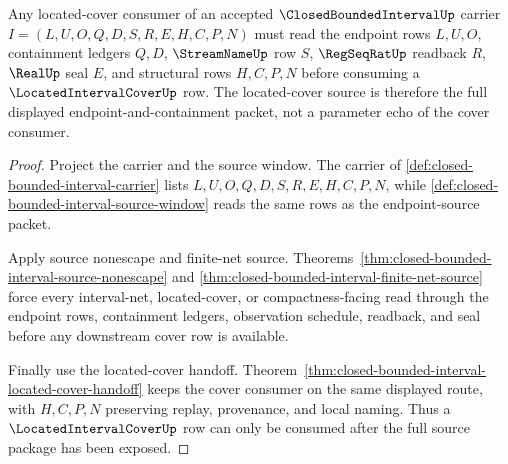 \begin{theorem}
\label{thm:closed-bounded-interval-located-cover-source-totality}
Any located-cover consumer of an accepted $\ClosedBoundedIntervalUp$ carrier $I=(L,U,O,Q,D,S,R,E,H,C,P,N)$ must read the endpoint rows $L,U,O$, containment ledgers $Q,D$, $\StreamNameUp$ row $S$, $\RegSeqRatUp$ readback $R$, $\RealUp$ seal $E$, and structural rows $H,C,P,N$ before consuming a $\LocatedIntervalCoverUp$ row. The located-cover source is therefore the full displayed endpoint-and-containment packet, not a parameter echo of the cover consumer.
\end{theorem}
\begin{proof}
Project the carrier and the source window. The carrier of \autoref{def:closed-bounded-interval-carrier} lists $L,U,O,Q,D,S,R,E,H,C,P,N$, while \autoref{def:closed-bounded-interval-source-window} reads the same rows as the endpoint-source packet.

Apply source nonescape and finite-net source. Theorems~\ref{thm:closed-bounded-interval-source-nonescape} and \ref{thm:closed-bounded-interval-finite-net-source} force every interval-net, located-cover, or compactness-facing read through the endpoint rows, containment ledgers, observation schedule, readback, and seal before any downstream cover row is available.

Finally use the located-cover handoff. Theorem~\ref{thm:closed-bounded-interval-located-cover-handoff} keeps the cover consumer on the same displayed route, with $H,C,P,N$ preserving replay, provenance, and local naming. Thus a $\LocatedIntervalCoverUp$ row can only be consumed after the full source package has been exposed.
\end{proof}

